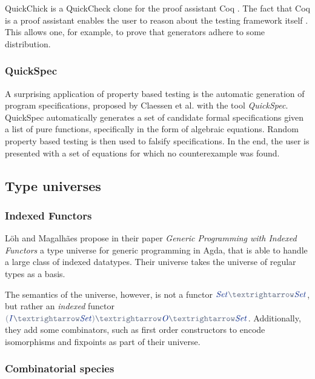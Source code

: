 \documentclass[a4paper,msc,twosized=semi]{uustthesis}
\newcommand*{\mathcolor}{}
\def\mathcolor#1#{\mathcoloraux{#1}}
\newcommand*{\mathcoloraux}[3]{%
  \protect\leavevmode
  \begingroup
    \color#1{#2}#3%
  \endgroup
}
\newcommand{\HSSpecial}[1]{\mathcolor{hsblue4}{#1}}
\newcommand{\HSSym}[1]{\mathcolor{hsblue4}{#1}}
\newcommand{\HSCon}[1]{\mathcolor{hsblue3}{\mathit{#1}}}
\begin{document}
  QuickChick is a QuickCheck clone for the proof assistant Coq \cite
  {denes2014quickchick}. The fact that Coq is a proof assistant enables the user to 
  reason about the testing framework itself \cite{paraskevopoulou2015foundational}. 
  This allows one, for example, to prove that generators adhere to some distribution. 

\subsubsection{QuickSpec}

  A surprising application of property based testing is the automatic generation of 
  program specifications, proposed by Claessen et al. \cite{claessen2010quickspec} 
  with the tool \textit{QuickSpec}. QuickSpec automatically generates a set of 
  candidate formal specifications given a list of pure functions, specifically in the 
  form of algebraic equations. Random property based testing is then used to falsify 
  specifications. In the end, the user is presented with a set of equations for which 
  no counterexample was found.  

\subsection{Type universes}

\subsubsection{Indexed Functors}

  Löh and Magalhães propose in their paper \emph{Generic Programming with Indexed 
  Functors} \cite{loh2011generic} a type universe for generic programming in Agda, 
  that is able to handle a large class of indexed datatypes. Their universe takes the 
  universe of regular types as a basis. 
  
  The semantics of the universe, however, is not a functor \ensuremath{\HSCon{Set}\HSSym{→}\HSCon{Set}}, but rather an 
  \emph{indexed} functor \ensuremath{\HSSpecial{(}\HSCon{I}\HSSym{→}\HSCon{Set}\HSSpecial{)}\HSSym{→}\HSCon{O}\HSSym{→}\HSCon{Set}}. Additionally, they add some 
  combinators, such as first order constructors to encode isomorphisms and fixpoints 
  as part of their universe. 

\subsubsection{Combinatorial species}
\end{document}
